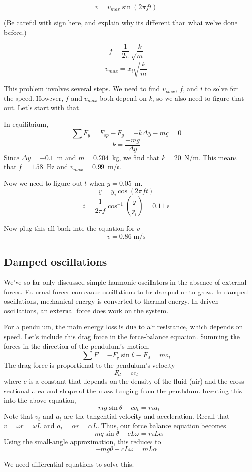  $$v=v_{max}\sin(2\pi ft)$$

 (Be careful with sign here, and explain why its different than what we've done before.)

 $$f=\frac{1}{2\pi}\sqrt\frac{k}{m}$$
 $$v_{max}=x_i\sqrt{\frac{k}{m}}$$

 This problem involves several steps. We need to find $v_{max}$, $f$, and $t$ to solve for the speed. However, $f$ and $v_{max}$ both depend on $k$, so we also need to figure that out. Let's start with that.

 In equilibrium,
 $$\sum F_y = F_{sp}-F_g = -k\Delta y-mg = 0$$
 $$k=\frac{-mg}{\Delta y}$$
 Since $\Delta y=-0.1$~m and $m=0.204$~kg, we find that $k=20$~N/m. This means that $f=1.58$~Hz and $v_{max}=0.99$~m/s. 

 Now we need to figure out $t$ when $y=0.05$~m.
 $$y=y_i\cos(2\pi ft)$$
 $$t=\frac{1}{2\pi f}\cos^{-1}\left(\frac{y}{y_i}\right)=0.11\mbox{ s}$$

 Now plug this all back into the equation for $v$
 $$\boxed{v=0.86\mbox{ m/s}}$$
 
\subsection{Damped oscillations}
We've so far only discussed simple harmonic oscillators in the absence of external forces. External forces can cause oscillations to be damped or to grow. In damped oscillations, mechanical energy is converted to thermal energy. In driven oscillations, an external force does work on the system.

For a pendulum, the main energy loss is due to air resistance, which depends on speed. Let's include this drag force in the force-balance equation. Summing the forces in the direction of the pendulum's motion,
$$\sum F=-F_g\sin\theta-F_d=ma_t$$
The drag force is proportional to the pendulum's velocity
$$F_d=cv_t$$
where $c$ is a constant that depends on the density of the fluid (air) and the cross-sectional area and shape of the mass hanging from the pendulum. Inserting this into the above equation,
$$-mg\sin\theta-cv_t=ma_t$$
Note that $v_t$ and $a_t$ are the tangential velocity and acceleration. Recall that $v=\omega r = \omega L$ and $a_t = \alpha r = \alpha L$. Thus, our force balance equation becomes
$$-mg\sin\theta - cL\omega = mL\alpha$$
Using the small-angle approximation, this reduces to
$$-mg\theta - cL\omega = mL\alpha$$

We need differential equations to solve this.

